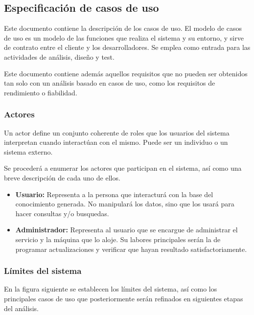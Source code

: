 
\subsection{Especificación de casos de uso}

Este documento contiene la descripción de los casos de uso. El modelo 
de casos de uso es un modelo de las funciones que realiza el sistema y 
su entorno, y sirve de contrato entre el cliente y los desarrolladores. 
Se emplea como entrada para las actividades de análisis, diseño y test.

Este documento contiene además aquellos requisitos que no pueden ser 
obtenidos tan solo con un análisis basado en casos de uso, como los 
requisitos de rendimiento o fiabilidad.

\subsubsection{Actores}

Un actor define un conjunto coherente de roles que los usuarios del 
sistema interpretan cuando interactúan con el mismo. Puede ser un 
individuo o un sistema externo.

Se procederá a enumerar los actores que participan en el sistema, 
así como una breve descripción de cada uno de ellos.

\begin{itemize}
  \item \textbf{Usuario:} Representa a la persona que interacturá con 
	la base del conocimiento generada. No manipulará los datos, 
	sino que los usará para hacer consultas y/o busquedas.
  \item \textbf{Administrador:} Representa al usuario que se encargue 
	de administrar el servicio y la máquina que lo aloje. Su labores 
	principales serán la de programar actualizaciones y verificar 
	que hayan resultado satisfactoriamente.
\end{itemize}

\subsubsection{Límites del sistema}

En la figura siguiente se establecen los límites del sistema, así 
como los principales casos de uso que posteriormente serán refinados 
en siguientes etapas del análisis.

